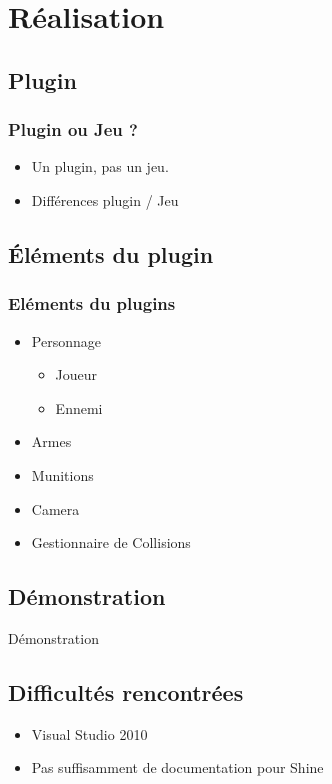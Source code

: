 \documentclass[12pt,handout]{beamer}
\begin{document}
\section{Réalisation}
\subsection{Plugin}
\begin{frame}
\frametitle{Plugin ou Jeu ?}
\begin{itemize}
\item
Un plugin, pas un jeu.
\item
Différences plugin / Jeu
\end{itemize}
\end{frame}

\subsection{Éléments du plugin}
\begin{frame}
\frametitle{Eléments du plugins}
\begin{itemize}
\item
Personnage
\begin{itemize}
\item
Joueur
\item
Ennemi
\end{itemize}
\item
Armes
\item
Munitions
\item
Camera
\item
Gestionnaire de Collisions

\end{itemize}

\end{frame}

\subsection{Démonstration}
\begin{frame}[plain,c]
\begin{center}
\Huge Démonstration
\end{center}


\end{frame}

\subsection{Difficultés rencontrées}
\begin{frame}
\begin{itemize}
\item
Visual Studio 2010
\item
Pas suffisamment de documentation pour Shine
\end{itemize}
\end{frame}
\end{document}
